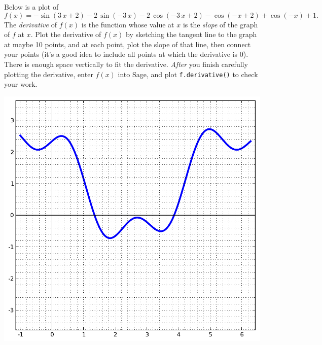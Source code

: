 Below is a plot of $$f(x)=-\sin\left(3 \, x + 2\right) - 2 \, \sin\left(-3 \, x\right) - 2 \, \cos\left(-3 \, x + 2\right) - \cos\left(-x + 2\right) + \cos\left(-x\right) + 1.$$  The {\em \color{red}derivative} of $f(x)$ is the function whose value at $x$ is the {\em slope} of the graph of $f$ at $x$.  Plot the derivative of $f(x)$ by sketching the tangent line to the graph at maybe 10 points, and at each point, plot the slope of that line, then connect your points (it's a good idea to include all points at which the derivative is 0).  There is enough space vertically to fit the derivative.  {\em After} you finish carefully plotting the derivative, enter $f(x)$ into Sage, and plot {\color{blue}\verb|f.derivative()|} to check your work.
\begin{center}\includegraphics{functions/86.pdf}\end{center}\newpage


